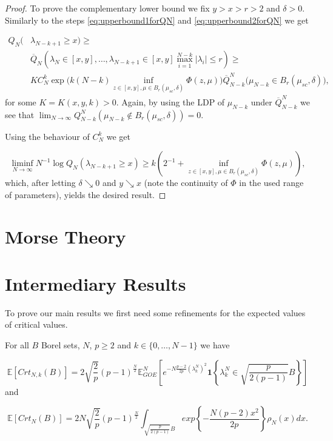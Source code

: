 \begin{proof}
	To prove the complementary lower bound we fix $y>x>r>2$ and $\delta>0$. Similarly to the steps \ref{eq:upperbound1forQN} and \ref{eq:upperbound2forQN} we get
	
	\begin{align*}
		Q_N(&\lambda_{N-k+1}\geq x)\geq \\
		&\overline Q_N(\lambda_N\in[x,y],\dots,\lambda_{N-k+1}\in[x,y]\max_{i=1}^{N-k}|\lambda_i|\leq r)\geq\\
		&KC_N^k\exp\Big(k(N-k)\inf_{z\in[x,y],\mu\in B_r(\mu_{sc},\delta)}\Phi(z,\mu)\Big)\overline Q_{N-k}^N\big(\mu_{N-k}\in B_r(\mu_{sc},\delta)\big),
	\end{align*}
	for some $K=K(x,y,k)>0$. Again, by using the LDP of $\mu_{N-k}$ under $\overline Q_{N-k}^N$ we see that $\lim_{N\rightarrow\infty}Q_{N-k}^N(\mu_{N-k}\notin B_r(\mu_{sc},\delta))=0$.
	
	Using the behaviour of $C_N^k$ we get
	
	\begin{equation*}
		\liminf_{N\rightarrow\infty}N^{-1}\log Q_N(\lambda_{N-k+1}\geq x)\geq k(2^{-1} + \inf_{z\in[x,y],\mu\in B_r(\mu_{sc},\delta)}\Phi(z,\mu)),
	\end{equation*}
	which, after letting $\delta\searrow 0$ and $y\searrow x$ (note the continuity of $\Phi$ in the used range of parameters), yields the desired result.
\end{proof}

\section{Morse Theory}

\section{Intermediary Results}
To prove our main results we first need some refinements for the expected values of critical values.

\begin{theorem}
	For all $B$ Borel sets, $N$, $p\geq 2$ and $k\in\{0,\dots,N-1\}$ we have

	\begin{equation}\label{thm:2.1}
		\mathbb E[Crt_{N,k}(B)]=2\sqrt{\frac{2}{p}}(p-1)^{\frac{N}{2}}\mathbb E_{GOE}^N\left[e^{-N\frac{p-2}{2p}(\lambda_k^N)^2}\bm 1\left\{\lambda_k^N\in\sqrt{\frac{p}{2(p-1)}}B \right\}\right]
	\end{equation} and
	
	\begin{equation}\label{thm:2.2}
		\mathbb E[Crt_N(B)]=2N\sqrt{\frac{2}{p}}(p-1)^{\frac{N}{2}}\int_{\sqrt{\frac{p}{2(p-1)}}B}exp\left\{-\frac{N(p-2)x^2}{2p}\right\}\rho_N(x)dx.
	\end{equation}
\end{theorem}

